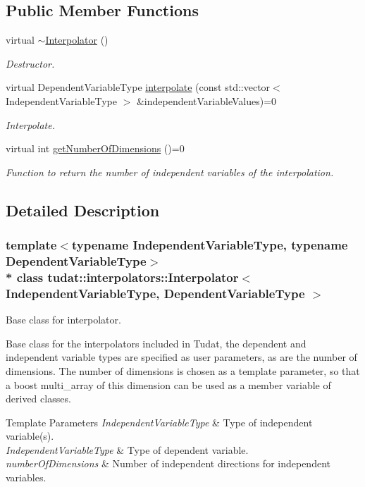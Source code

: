 \subsection*{Public Member Functions}
\begin{DoxyCompactItemize}
\item 
virtual \hyperlink{classtudat_1_1interpolators_1_1Interpolator_ac6359fc3104b07fb6cac0b3b3221cc3d}{$\sim$\+Interpolator} ()
\begin{DoxyCompactList}\small\item\em Destructor. \end{DoxyCompactList}\item 
virtual Dependent\+Variable\+Type \hyperlink{classtudat_1_1interpolators_1_1Interpolator_a0b8c3f199c7a2297928936f00790f190}{interpolate} (const std\+::vector$<$ Independent\+Variable\+Type $>$ \&independent\+Variable\+Values)=0
\begin{DoxyCompactList}\small\item\em Interpolate. \end{DoxyCompactList}\item 
virtual int \hyperlink{classtudat_1_1interpolators_1_1Interpolator_a2fec09b3d811b2399d9abce5c8917b5a}{get\+Number\+Of\+Dimensions} ()=0
\begin{DoxyCompactList}\small\item\em Function to return the number of independent variables of the interpolation. \end{DoxyCompactList}\end{DoxyCompactItemize}


\subsection{Detailed Description}
\subsubsection*{template$<$typename Independent\+Variable\+Type, typename Dependent\+Variable\+Type$>$\\*
class tudat\+::interpolators\+::\+Interpolator$<$ Independent\+Variable\+Type, Dependent\+Variable\+Type $>$}

Base class for interpolator. 

Base class for the interpolators included in Tudat, the dependent and independent variable types are specified as user parameters, as are the number of dimensions. The number of dimensions is chosen as a template parameter, so that a boost multi\+\_\+array of this dimension can be used as a member variable of derived classes. 
\begin{DoxyTemplParams}{Template Parameters}
{\em Independent\+Variable\+Type} & Type of independent variable(s). \\
\hline
{\em Independent\+Variable\+Type} & Type of dependent variable. \\
\hline
{\em number\+Of\+Dimensions} & Number of independent directions for independent variables. \\
\hline
\end{DoxyTemplParams}


